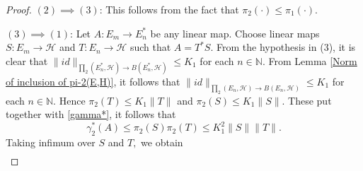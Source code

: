 \documentclass[a4paper,oneside,11pt, reqno]{amsart}
\numberwithin{equation}{section}
\theoremstyle{plain}
\begin{document}
\begin{proof}
\textbf{$(2) \implies (3)$}: This follows from the fact that $\pi_2(\cdot)\leqslant \pi_1(\cdot).$ 

\textbf{$(3) \implies (1)$}:
Let $A:E_m\to E_n^*$ be any linear map. Choose linear maps $S:E_m\to\mathcal{H}$ and $T:E_n\to\mathcal{H}$ such that $A=T^*S$. 
From the hypothesis in (3), it is clear that $\|id\|_{\prod_2(E_n^*,\mathcal H)\to B(E_n^*,\mathcal H)}\leqslant K_1$ for each $n\in\mathbb N.$ From Lemma \ref{Norm of inclusion of pi-2(E,H)}, it follows that $\|id\|_{\prod_2(E_n,\mathcal H)\to B(E_n,\mathcal H)}\leqslant K_1$ for each $n\in\mathbb N.$ Hence $\pi_2(T)\leqslant K_1\|T\|$ and $\pi_2(S)\leqslant K_1 \|S\|.$
These put together with \eqref{gamma*}, it follows that
\[\gamma_2^*(A)\leqslant \pi_2(S)\pi_2(T)\leqslant K_1^2\|S\| \|T\|.\] 
Taking infimum over $S$ and $T,$ we obtain 
\begin{eqnarray}\label{gamma2* in 3 to 1}

\end{eqnarray}
\end{proof}
\end{document}
